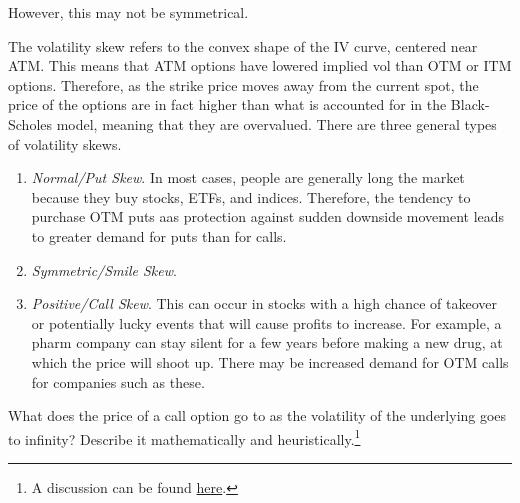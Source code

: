 \documentclass{article}
\begin{document}
    However, this may not be symmetrical. 

    \begin{definition}
      The volatility skew refers to the convex shape of the IV curve, centered near ATM. This means that ATM options have lowered implied vol than OTM or ITM options. Therefore, as the strike price moves away from the current spot, the price of the options are in fact higher than what is accounted for in the Black-Scholes model, meaning that they are overvalued. There are three general types of volatility skews.

      \begin{enumerate}
        \item \textit{Normal/Put Skew}. In most cases, people are generally long the market because they buy stocks, ETFs, and indices. Therefore, the tendency to purchase OTM puts aas protection against sudden downside movement leads to greater demand for puts than for calls.
        \item \textit{Symmetric/Smile Skew}.
        \item \textit{Positive/Call Skew}. This can occur in stocks with a high chance of takeover or potentially lucky events that will cause profits to increase. For example, a pharm company can stay silent for a few years before making a new drug, at which the price will shoot up. There may be increased demand for OTM calls for companies such as these.
      \end{enumerate}
    \end{definition}

    \begin{exercise}
      What does the price of a call option go to as the volatility of the underlying goes to infinity? Describe it mathematically and heuristically.\footnote{A discussion can be found \href{https://quant.stackexchange.com/questions/39490/value-of-call-option-as-volatility-goes-to-infinity}{here}. } 
    \end{exercise}
\end{document}

